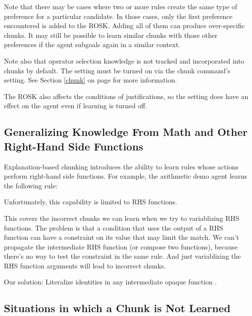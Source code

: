 Note that there may be cases where two or more rules create the same type of preference for a particular candidate. In those cases, only the first preference encountered is added to the ROSK. Adding all of them can produce over-specific chunks. It may still be possible to learn similar chunks with those other preferences if the agent subgoals again in a similar context.

Note also that operator selection knowledge is not tracked and incorporated into chunks by default. The setting must be turned on via the chunk command's  setting. See Section \ref{chunk} on page \pageref{chunk} for more information. 

The ROSK also affects the conditions of justifications, so the  setting does have an effect on the agent even if learning is turned off.


\subsection{Generalizing Knowledge From Math and Other Right-Hand Side Functions}

Explanation-based chunking introduces the ability to learn rules whose actions perform right-hand side functions.  For example, the arithmetic demo agent learns the following rule:


Unfortunately, this capability is limited to RHS functions.

This covers the incorrect chunks we can learn when we try to variablizing RHS functions.  The problem is that a condition that uses the output of a RHS function can have a constraint on its value that may limit the match.  We can't propagate the intermediate RHS function (or compose two functions), because there's no way to test the constraint in the same rule.  And just variablizing the RHS function arguments will lead to incorrect chunks.

Our solution:  Literalize identities in any intermediate opaque function .


\subsection{Situations in which a Chunk is Not Learned}


